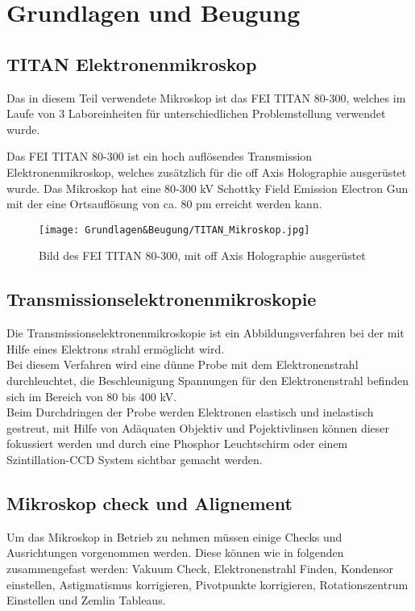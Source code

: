 \section{Grundlagen und Beugung}
\subsection{TITAN Elektronenmikroskop}
Das in diesem Teil verwendete Mikroskop ist das FEI TITAN 80-300, welches im Laufe von 3 Laboreinheiten für unterschiedlichen Problemstellung verwendet wurde.

Das FEI TITAN 80-300 ist ein hoch auflösendes Transmission Elektronenmikroskop, welches zusätzlich für die off Axis Holographie ausgerüstet wurde. Das Mikroskop hat eine 80-300 kV Schottky Field Emission Electron Gun mit der eine Ortsauflösung von ca. 80 pm erreicht werden kann.

\begin{figure}[htbp]
 \centering
 \texttt{[image: Grundlagen\&Beugung/TITAN\_Mikroskop.jpg]}
 \caption[FEI TITAN 80-300]{Bild des FEI TITAN 80-300, mit off Axis Holographie ausgerüstet }
 \label{TITANMikroskop}
\end{figure}


\subsection{Transmissionselektronenmikroskopie}

Die Transmissionselektronenmikroskopie ist ein Abbildungsverfahren bei der mit Hilfe eines Elektrons strahl ermöglicht wird.\\
Bei diesem Verfahren wird eine dünne Probe mit dem Elektronenstrahl durchleuchtet, die Beschleunigung Spannungen für den Elektronenstrahl befinden sich im Bereich von 80 bis 400 kV.\\
Beim Durchdringen der Probe werden Elektronen elastisch und inelastisch gestreut, mit Hilfe von Adäquaten Objektiv und Pojektivlinsen können dieser fokussiert werden und durch eine Phosphor Leuchtschirm oder einem Szintillation-CCD System sichtbar gemacht werden.

\subsection{Mikroskop check und Alignement}
Um das Mikroskop in Betrieb zu nehmen müssen einige Checks und Ausrichtungen vorgenommen werden. Diese können wie in folgenden zusammengefast werden: Vakuum Check, Elektronenstrahl Finden, Kondensor einstellen, Astigmatismus korrigieren, Pivotpunkte korrigieren, Rotationszentrum Einstellen und Zemlin Tableaus.

